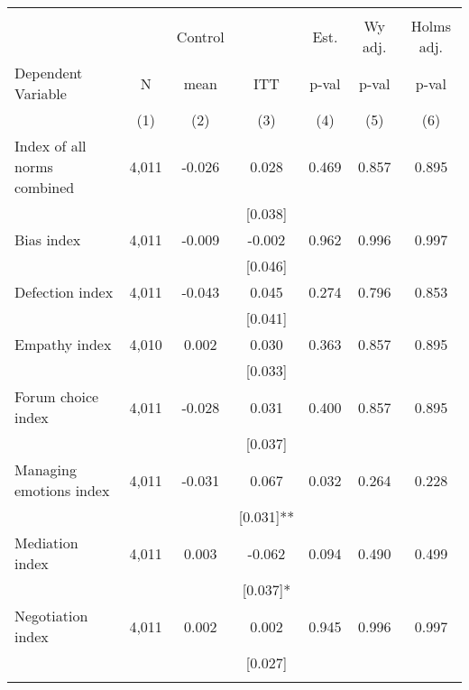 \begin{tabular}{lcccccc}
\hline \noalign{\smallskip} &  &  &  &  &  & \\
 &  & Control &  & Est. & Wy adj. & Holms adj.\\
Dependent Variable & N & mean & ITT & p-val & p-val & p-val\\
 & (1) & (2) & (3) & (4) & (5) & (6)\\
\noalign{\smallskip}\hline \noalign{\smallskip}Index of all norms combined & 4,011 & -0.026 & 0.028 & 0.469 & 0.857 & 0.895\\
 &  &  & [0.038] &  &  & \\
\quad Bias index & 4,011 & -0.009 & -0.002 & 0.962 & 0.996 & 0.997\\
 &  &  & [0.046] &  &  & \\
\quad Defection index & 4,011 & -0.043 & 0.045 & 0.274 & 0.796 & 0.853\\
 &  &  & [0.041] &  &  & \\
\quad Empathy index & 4,010 & 0.002 & 0.030 & 0.363 & 0.857 & 0.895\\
 &  &  & [0.033] &  &  & \\
\quad Forum choice index & 4,011 & -0.028 & 0.031 & 0.400 & 0.857 & 0.895\\
 &  &  & [0.037] &  &  & \\
\quad Managing emotions index & 4,011 & -0.031 & 0.067 & 0.032 & 0.264 & 0.228\\
 &  &  & [0.031]** &  &  & \\
\quad Mediation index & 4,011 & 0.003 & -0.062 & 0.094 & 0.490 & 0.499\\
 &  &  & [0.037]* &  &  & \\
\quad Negotiation index & 4,011 & 0.002 & 0.002 & 0.945 & 0.996 & 0.997\\
 &  &  & [0.027] &  &  & \\
\noalign{\smallskip}\hline\end{tabular}
